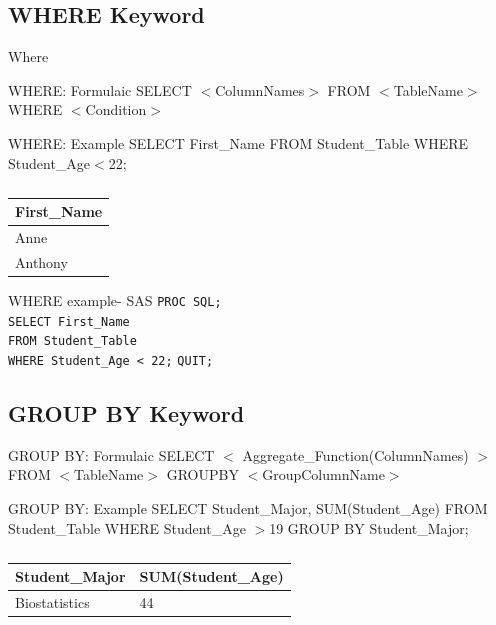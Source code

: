 \documentclass[handout]{beamer}
\begin{document}
	\subsection{WHERE Keyword}
	\begin{frame}{Where}
		\begin{block}{WHERE: Formulaic}
			SELECT $<$ColumnNames$>$ FROM $<$TableName$>$ 
			WHERE $<$Condition$>$
		\end{block}
		\begin{block}{WHERE: Example}
			SELECT First\_Name FROM Student\_Table 
			WHERE Student\_Age$<$22;
		\end{block}
		\begin{table}[H]
			\centering
			\caption*{}
			
			\begin{tabular}{|l|}
				\hline
				First\_Name  \\ \hline
				Anne  \\ \hline
				Anthony  \\    \hline
			\end{tabular}
		\end{table}		
	\end{frame}
	
	\begin{frame}{WHERE example- SAS}
		\texttt{PROC SQL;} \\
		\texttt{SELECT First\_Name } \\
		\texttt{FROM Student\_Table}\\
		\texttt{WHERE Student\_Age < 22;} 
		\texttt{QUIT;}
	\end{frame}
	\subsection{GROUP BY Keyword}
	\begin{frame}
		\begin{block}{GROUP BY: Formulaic}
			SELECT $<$ Aggregate\_Function(ColumnNames) $>$ FROM $<$TableName$>$ GROUPBY $<$GroupColumnName$>$
		\end{block}
		\begin{block}{GROUP BY: Example}
			SELECT Student\_Major, SUM(Student\_Age) FROM Student\_Table WHERE Student\_Age $>$19 GROUP BY Student\_Major;
		\end{block}
		\begin{table}[H]
			\centering
			\caption*{}
			
			\begin{tabular}{|l|l|}
				\hline
				Student\_Major & SUM(Student\_Age)  \\ \hline
				Biostatistics  & 44 \\ \hline
			\end{tabular}
		\end{table}			
	\end{frame}
	
\end{document}
